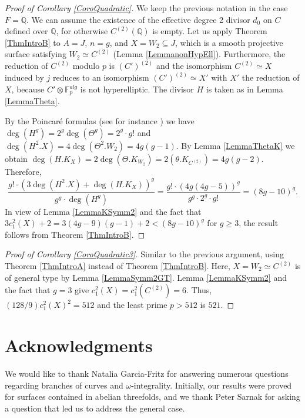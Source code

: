 \documentclass[11pt]{amsart}
\theoremstyle{remark}
\numberwithin{equation}{section}
\newcommand{\F}{\mathbb{F}}
\newcommand{\Q}{\mathbb{Q}}
\begin{document}
\begin{proof}[Proof of Corollary \ref{CoroQuadratic}] We keep the previous notation in the case $F=\Q$. We can assume the existence of the effective degree $2$ divisor $d_0$ on $C$ defined over $\Q$, for otherwise $C^{(2)}(\Q)$ is empty. Let us apply Theorem \ref{ThmIntroB} to $A=J$, $n=g$,  and $X=W_2\subseteq J$, which is a smooth projective surface satisfying $W_2\simeq C^{(2)}$ (Lemma \ref{LemmanonHypEll}). Furthermore, the reduction of $C^{(2)}$ modulo $p$ is $(C')^{(2)}$ and the isomorphism $C^{(2)}\simeq X$ induced by $j$ reduces to an isomorphism $(C')^{(2)}\simeq X'$ with $X'$ the reduction of $X$, because $C'\otimes \F_p^{alg}$ is not hyperelliptic. The divisor $H$ is taken as in Lemma \ref{LemmaTheta}. 

By the Poincar\'e formulas (see for instance \cite{KouvidakisTAMS93}) we have $\deg(H^g)=2^g\deg(\Theta^g)=2^g\cdot g!$ and $\deg(H^2.X)=4\deg(\Theta^2.W_2)=4g(g-1)$. By Lemma \ref{LemmaThetaK} we obtain $\deg(H.K_X)=2\deg(\Theta.K_{W_2})=2 (\theta.K_{C^{(2)}})=4g(g-2)$. Therefore,
$$
\frac{g!\cdot (3\deg(H^{2}.X) + \deg(H.K_X))^g}{g^g\cdot \deg(H^g)} = \frac{g!\cdot (4g(4g-5))^g}{g^g\cdot 2^g\cdot g!}=(8g-10)^g.
$$
In view of Lemma \ref{LemmaKSymm2} and the fact that $3c_1^2(X)+2=3(4g-9)(g-1)+2<(8g-10)^g$ for $g\ge 3$, the result follows from Theorem \ref{ThmIntroB}.
\end{proof}

\begin{proof}[Proof of Corollary \ref{CoroQuadratic3}] Similar to the previous argument, using Theorem \ref{ThmIntroA} instead of Theorem \ref{ThmIntroB}. Here, $X=W_2\simeq C^{(2)}$ is of general type by Lemma \ref{LemmaSymm2GT}. Lemma \ref{LemmaKSymm2} and the fact that $g=3$ give $c_1^2(X)=c_1^2(C^{(2)})=6$. Thus, $(128/9)c_1^2(X)^2= 512$ and the least prime $p>512$ is $521$.
\end{proof}





\section{Acknowledgments}
We would like to thank Natalia Garcia-Fritz for answering numerous questions regarding branches of curves and $\omega$-integrality. Initially, our results were proved for surfaces contained in abelian threefolds, and we thank Peter Sarnak for asking a question that led us to address the general case.
\end{document}
